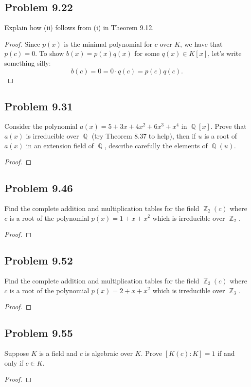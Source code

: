 \documentclass[letterpaper, 12pt]{amsart}
\DeclareMathOperator{\Z}{\mathbb{Z}}
\DeclareMathOperator{\Q}{\mathbb{Q}}
\theoremstyle{definition}  %
\begin{document}
	\subsection*{Problem 9.22}
	\label{sub:problem_9_22}
	Explain how (ii) follows from (i) in Theorem 9.12.

		\begin{proof}
		Since $p(x)$ is the minimal polynomial for $c$ over $K$, we have that $p(c) = 0$.
		To show $b(x) = p(x)q(x)$ for some $q(x) \in K[x]$, let's write something silly: $$b(c) = 0 = 0 \cdot q(c) = p(c)q(c).$$
		\end{proof}

	\subsection*{Problem 9.31}
	\label{sub:problem_9_31}
	Consider the polynomial $a(x) = 5 + 3x + 4x^{2} + 6x^{3} + x^{4}$ in $\Q[x]$.
	Prove that $a(x)$ is irreducible over $\Q$ (try Theorem 8.37 to help), then if $u$ is a root of $a(x)$ in an extension field of $\Q$, describe carefully the elements of $\Q(u)$.

		\begin{proof}
		\end{proof}

	\subsection*{Problem 9.46}
	\label{sub:problem_9_46}
	Find the complete addition and multiplication tables for the field $\Z_{2}(c)$ where $c$ is a root of the polynomial $p(x) = 1 + x + x^{2}$ which is irreducible over $\Z_{2}$.

		\begin{proof}
		\end{proof}

	\subsection*{Problem 9.52}
	\label{sub:problem_9_52}
	Find the complete addition and multiplication tables for the field $\Z_{3}(c)$ where $c$ is a root of the polynomial $p(x) = 2 + x + x^{2}$ which is irreducible over $\Z_{3}$.

		\begin{proof}
		\end{proof}

	\subsection*{Problem 9.55}
	\label{sub:problem_9_55}
	Suppose $K$ is a field and $c$ is algebraic over $K$.
	Prove $[K(c) : K] = 1$ if and only if $c \in K$.

		\begin{proof}
		\end{proof}
\end{document}
